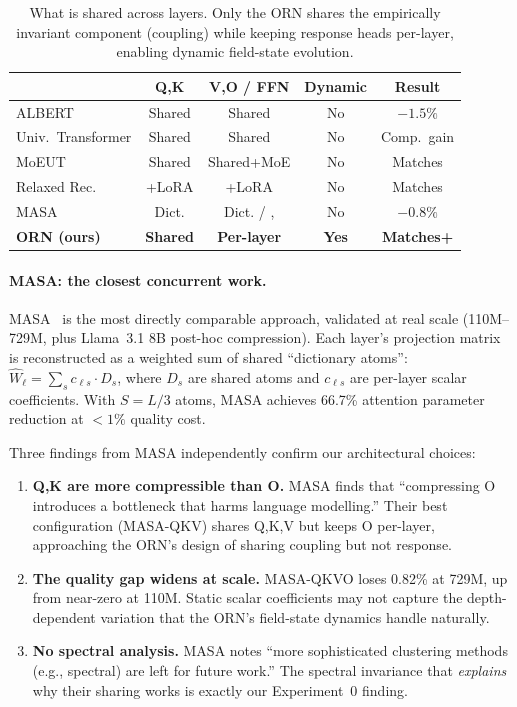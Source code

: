 \documentclass[11pt, a4paper]{article}
\theoremstyle{plain}
\theoremstyle{remark}
\begin{document}
\begin{table}[h]
\centering\footnotesize
\begin{tabular}{@{}lcccc@{}}
\toprule
& \textbf{Q,K} & \textbf{V,O / FFN} & \textbf{Dynamic} & \textbf{Result} \\
\midrule
ALBERT~\cite{lan2020albert} & Shared & Shared & No & $-1.5\%$ \\
Univ.\ Transformer & Shared & Shared & No & Comp.\ gain \\
MoEUT~\cite{moeut2024} & Shared & Shared+MoE & No & Matches \\
Relaxed Rec.~\cite{mol2025} & +LoRA & +LoRA & No & Matches \\
MASA~\cite{masa2025} & Dict. & Dict. / ,  & No & $-0.8\%$ \\
\textbf{ORN (ours)} & \textbf{Shared} & \textbf{Per-layer} & \textbf{Yes} & \textbf{Matches+} \\
\bottomrule
\end{tabular}
\caption{What is shared across layers. Only the ORN shares the empirically invariant component (coupling) while keeping response heads per-layer, enabling dynamic field-state evolution.}
\end{table}

\paragraph{MASA: the closest concurrent work.}
MASA~\cite{masa2025} is the most directly comparable approach, validated at real scale (110M--729M, plus Llama~3.1 8B post-hoc compression).
Each layer's projection matrix is reconstructed as a weighted sum of shared ``dictionary atoms'': $\hat{W}_\ell = \sum_s c_{\ell s} \cdot D_s$, where $D_s$ are shared atoms and $c_{\ell s}$ are per-layer scalar coefficients.
With $S = L/3$ atoms, MASA achieves 66.7\% attention parameter reduction at $< 1\%$ quality cost.

Three findings from MASA independently confirm our architectural choices:
\begin{enumerate}[nosep]
    \item \textbf{Q,K are more compressible than O.}
    MASA finds that ``compressing O introduces a bottleneck that harms language modelling.''
    Their best configuration (MASA-QKV) shares Q,K,V but keeps O per-layer, approaching the ORN's design of sharing coupling but not response.
    \item \textbf{The quality gap widens at scale.}
    MASA-QKVO loses 0.82\% at 729M, up from near-zero at 110M.
    Static scalar coefficients may not capture the depth-dependent variation that the ORN's field-state dynamics handle naturally.
    \item \textbf{No spectral analysis.}
    MASA notes ``more sophisticated clustering methods (e.g., spectral) are left for future work.''
    The spectral invariance that \emph{explains} why their sharing works is exactly our Experiment~0 finding.
\end{enumerate}
\end{document}
